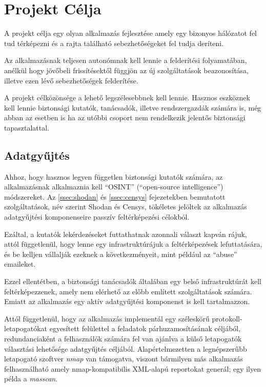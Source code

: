 \documentclass[a4paper,12pt]{article}
\begin{document}
	\begingroup
	\hypersetup{linkcolor=lightblue}
	\listoffigures
	\renewcommand*{\listoflistingscaption}{Kódrészletek jegyzéke}
	\listoflistings
	\endgroup

\newpage
\pagestyle{fancy}
\section{Projekt Célja}

	A projekt célja egy olyan alkalmazás fejlesztése amely egy bizonyos hálózatot fel tud térképezni és a rajta található sebezhetőségeket fel tudja deríteni.
	
	Az alkalmazásnak teljesen autonómnak kell lennie a felderítési folyamatában, anélkül hogy jövőbeli frissítésektől függjön az új szolgáltatások beazonosítása, illetve ezen lévő sebezhetőségek felderítése.

	A projekt célközönsége a lehető legszélesebbnek kell lennie. Hasznos eszköznek kell lennie biztonsági kutatók, tanácsadók, illetve rendszergazdák számára is, még abban az esetben is ha az utóbbi csoport nem rendelkezik jelentős biztonsági tapasztalattal.

\subsection{Adatgyűjtés}

	Ahhoz, hogy hasznos legyen független biztonsági kutatók számára, az alkalmazásnak alkalmaznia kell ``OSINT'' (``open-source intelligence'') módszereket. Az \ref{ssec:shodan} és \ref{ssec:censys} fejezetekben bemutatott szolgáltatások, név szerint Shodan\cite{shodan16} és Censys\cite{censys15}, tökéletes jelöltek az alkalmazás adatgyűjtési komponenseire passzív feltérképezési célokból.
	
	Ezáltal, a kutatók lekérdezéseket futtathatnak azonnali választ kapván rájuk, attól függetlenül, hogy lenne egy infrastruktúrájuk a feltérképezések lefuttatására, és be kelljen vállalják ezeknek a következményeit, mint például az ``abuse'' emaileket.
	
	Ezzel ellentétben, a biztonsági tanácsadók általában egy belső infrastruktúrát kell feltérképezzenek, amely nem elérhető az előbb említett szolgáltatások számára. Emiatt az alkalmazás egy aktív adatgyűjtési komponenst is kell tartalmazzon.
	
	Attól függetlenül, hogy az alkalmazás implementál egy széleskörű protokoll-letapogatókat egyesített felülettel a feladatok párhuzamosításának céljából, redundanciaként a felhasználók számára fel van ajánlva a külső letapogatók választási lehetősége adatgyűjtés céljából. Alapértelmezetten a legnépszerűbb letapogató szoftver \textit{nmap} van támogatva, viszont bármilyen más alkalmazás felhasználható amely nmap-kompatibilis XML-alapú reportokat generál; egy ilyen példa a \textit{masscan}.
\end{document}
